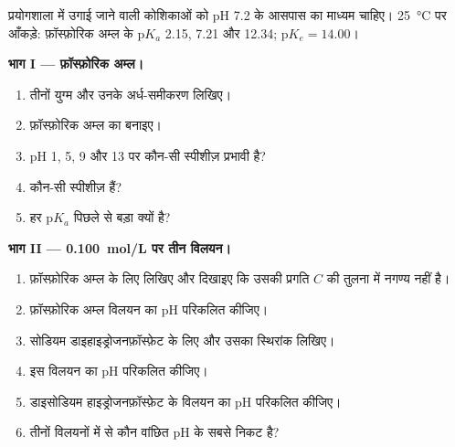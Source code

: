 \begin{problem}
\label{pb:b1:predominant-reaction:1}
प्रयोगशाला में उगाई जाने वाली कोशिकाओं को pH 7.2 के आसपास का माध्यम चाहिए।
\qty{25}{\celsius} पर आँकड़े: फ़ॉस्फ़ोरिक अम्ल के $\mathrm{p}K_a$ 2.15, 7.21 और
12.34; $\mathrm{p}K_e = 14.00$।

\medskip
\noindent\textbf{भाग I --- फ़ॉस्फ़ोरिक अम्ल।}
\begin{enumerate}
  \item तीनों युग्म और उनके अर्ध-समीकरण लिखिए।
  \item फ़ॉस्फ़ोरिक अम्ल का  बनाइए।
  \item pH 1, 5, 9 और 13 पर कौन-सी स्पीशीज़ प्रभावी है?
  \item कौन-सी स्पीशीज़  हैं?
  \item हर $\mathrm{p}K_a$ पिछले से बड़ा क्यों है?
\end{enumerate}

\medskip
\noindent\textbf{भाग II --- \qty{0.100}{mol/L} पर तीन विलयन।}
\begin{enumerate}[resume]
  \item फ़ॉस्फ़ोरिक अम्ल के लिए  लिखिए और दिखाइए कि
        उसकी प्रगति $C$ की तुलना में नगण्य नहीं है।
  \item फ़ॉस्फ़ोरिक अम्ल विलयन का pH परिकलित कीजिए।
  \item सोडियम डाइहाइड्रोजनफ़ॉस्फ़ेट  के लिए  और उसका स्थिरांक लिखिए।
  \item इस विलयन का pH परिकलित कीजिए।
  \item डाइसोडियम हाइड्रोजनफ़ॉस्फ़ेट
         के विलयन का pH परिकलित कीजिए।
  \item तीनों विलयनों में से कौन वांछित pH के सबसे निकट है?
\end{enumerate}


\end{problem}
